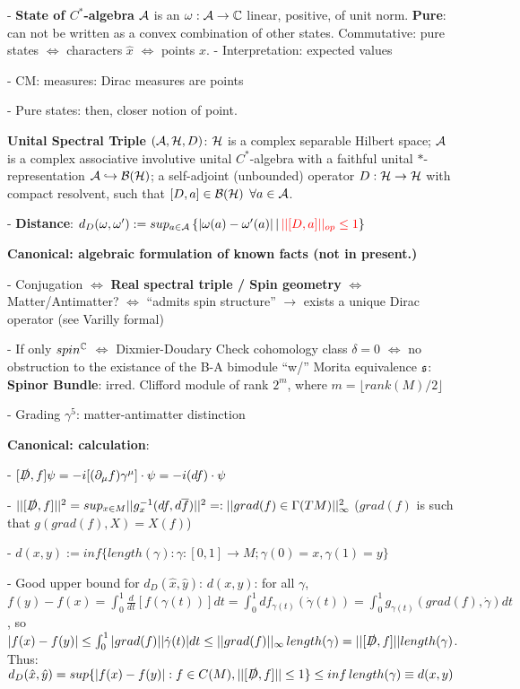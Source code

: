     - \textbf{State of $C^*$-algebra} $\mathcal A$ is an $\omega : \mathcal A \to \mathbb{C}$ linear, positive, of unit norm. \textbf{Pure}: can not be written as a convex combination of other states. Commutative: pure states $\Longleftrightarrow$ characters $\hat x$ $\Longleftrightarrow$ points $x$.
        \quad - Interpretation: expected values
        
        \quad - CM: measures: Dirac measures are points
        
        \quad - Pure states: then, closer notion of point.
        
        
    
    \textbf{Unital Spectral Triple} $(\mathcal A , \mathcal H, D)$: $\mathcal H$ is a complex separable Hilbert space; $\mathcal A$ is a complex associative involutive unital $C^*$-algebra with a faithful unital $*$-representation $\mathcal A \hookrightarrow \mathcal B(\mathcal H)$; a self-adjoint (unbounded) operator $D: \mathcal H \to \mathcal H$ with compact resolvent, such that $[D, a] \in \mathcal B(\mathcal H)$ $\forall a \in \mathcal A$.
    
    - \textbf{Distance}: $d_D(\omega, \omega') := sup_{a \in \mathcal A} \left\{|\omega(a) - \omega'(a)| \, | \, \textcolor{red}{||[D, a]||_{op} \leq 1} \right\}$
    

\textbf{Canonical: algebraic formulation of known facts (not in present.)}

 - Conjugation $\iff$ \textbf{Real spectral triple / Spin geometry} $\iff$ Matter/Antimatter? $\iff$ ``admits spin structure'' $\to$ exists a unique Dirac operator (see Varilly formal)
 
 - If only $spin^{\mathbb{C}}$ $\iff$ Dixmier-Doudary Check cohomology class $\delta = 0$ $\iff$ no obstruction to the existance of the B-A bimodule ``w/'' Morita equivalence $\mathfrak{s}$: \textbf{Spinor Bundle}: irred. Clifford module of rank $2^m$, where $m = \lfloor rank(M)/2 \rfloor$
 
 - Grading $\gamma^5$: matter-antimatter distinction


\textbf{Canonical: calculation}:

- $[\slashed D, f]\psi = -i [(\partial_\mu f) \gamma^\mu] \cdot \psi = -i(df)\cdot \psi$
    
    - $||[\slashed D, f]||^2 = sup_{x \in M} ||g_x^{-1}(df, d \overline{f})||^2 =: ||grad(f) \in \Gamma(TM)||_\infty^2$ ($grad(f)$ is such that $g(grad(f), X) = X(f)$)

    - $d(x, y) := inf\{length(\gamma): \gamma:[0,1] \to M; \gamma(0) = x, \gamma(1) = y\}$
    
    - Good upper bound for $d_D(\hat x, \hat y)$: $d(x, y)$: for all $\gamma$, $f(y) - f(x) = \int_0^1 \frac{d}{dt}[f(\gamma(t))]dt = \int_0^1 df_{\gamma(t)} (\dot \gamma(t)) = \int_0^1 g_{\gamma(t)}(grad(f), \dot \gamma) dt$, 
    so
    $|f(x) - f(y)| \leq \int_0^1 |grad(f)| |\dot \gamma(t)| dt \leq ||grad(f)||_
    \infty \, length(\gamma) = ||[\slashed D, f]|| length(\gamma)$. 
    Thus:
    $d_D(\hat x, \hat y) = sup\{|f(x) - f(y)|: f \in C(M), ||[\slashed D, f]||\leq 1\} \leq inf \, length(\gamma) \equiv d(x, y)$
    
